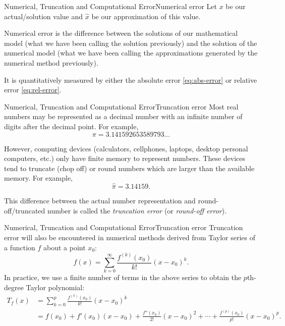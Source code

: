\documentclass[12pt,aspectratio=169,envcountset]{beamer}
\begin{document}
\begin{frame}{Numerical, Truncation and Computational Error}{Numerical error}
  Let $x$ be our actual/solution value and $\hat{x}$ be our approximation of
  this value.

  Numerical error is the difference between the solutions of our mathematical
  model (what we have been calling the solution previously) and the solution of
  the numerical model (what we have been calling the approximations generated by
  the numerical method previously).

  It is quantitatively measured by either the absolute error
  \eqref{eq:abs-error} or relative error \eqref{eq:rel-error}.
\end{frame}

\begin{frame}{Numerical, Truncation and Computational Error}{Truncation error}
  \label{fr:trunc-error}
  Most real numbers may be represented as a decimal number with an infinite
  number of digits after the decimal point.
  For example,
  \[
    \pi = 3.141592653589793...
  \]

  However, computing devices (calculators, cellphones, laptops, desktop personal
  computers, etc.) only have finite memory to represent numbers.
  These devices tend to truncate (chop off) or round numbers which are larger
  than the available memory.
  For example,
  \[
    \hat{\pi} = 3.14159.
  \]

  This difference between the actual number representation and
  round-off/truncated number is called the \emph{truncation error} (or
  \emph{round-off error}).
\end{frame}

\begin{frame}{Numerical, Truncation and Computational Error}{Truncation error}
  \label{fr:trunc-error-taylor-series}
  Truncation error will also be encountered in numerical methods derived from
  Taylor series of a function $f$ about a point $x_0$:
  \[
    f(x) = \sum_{k = 0}^\infty \frac{f^{(k)}(x_0)}{k!}(x - x_0)^k.
  \]
  In practice, we use a finite number of terms in the above series to obtain the
  $p$th-degree Taylor polynomial:
  \begin{align*}
    T_f(x) &= \sum_{k = 0}^p \frac{f^{(k)}(x_0)}{k!}(x - x_0)^k \\
    &= f(x_0) + f'(x_0)(x - x_0) + \frac{f''(x_0)}{2!}(x - x_0)^2 + \dotsb +
    \frac{f^{(p)}(x_0)}{p!}(x - x_0)^p.
  \end{align*}
\end{frame}
\end{document}
